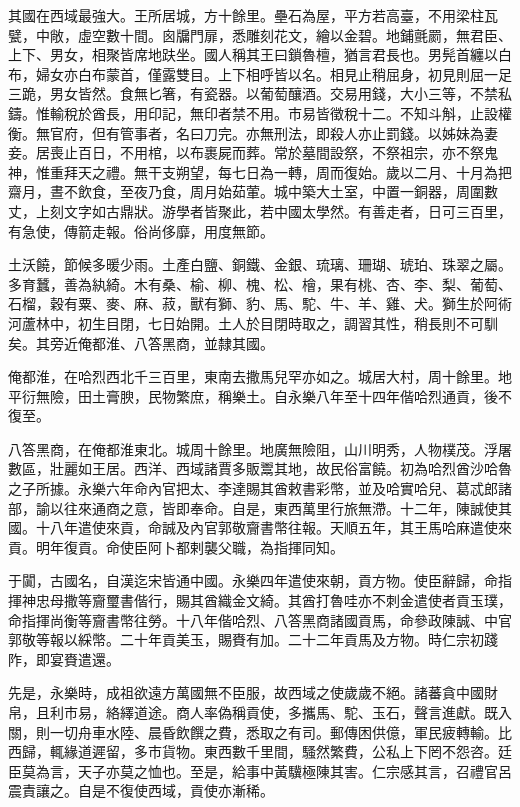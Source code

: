 \begin{pinyinscope}
其國在西域最強大。王所居城，方十餘里。壘石為屋，平方若高臺，不用梁柱瓦甓，中敞，虛空數十間。囪牖門扉，悉雕刻花文，繪以金碧。地鋪氈罽，無君臣、上下、男女，相聚皆席地趺坐。國人稱其王曰鎖魯檀，猶言君長也。男髡首纏以白布，婦女亦白布蒙首，僅露雙目。上下相呼皆以名。相見止稍屈身，初見則屈一足三跪，男女皆然。食無匕箸，有瓷器。以葡萄釀酒。交易用錢，大小三等，不禁私鑄。惟輸稅於酋長，用印記，無印者禁不用。市易皆徵稅十二。不知斗斛，止設權衡。無官府，但有管事者，名曰刀完。亦無刑法，即殺人亦止罰錢。以姊妹為妻妾。居喪止百日，不用棺，以布裹屍而葬。常於墓間設祭，不祭祖宗，亦不祭鬼神，惟重拜天之禮。無干支朔望，每七日為一轉，周而復始。歲以二月、十月為把齋月，晝不飲食，至夜乃食，周月始茹葷。城中築大土室，中置一銅器，周圍數丈，上刻文字如古鼎狀。游學者皆聚此，若中國太學然。有善走者，日可三百里，有急使，傳箭走報。俗尚侈靡，用度無節。

土沃饒，節候多暖少雨。土產白鹽、銅鐵、金銀、琉璃、珊瑚、琥珀、珠翠之屬。多育蠶，善為紈綺。木有桑、榆、柳、槐、松、檜，果有桃、杏、李、梨、葡萄、石榴，穀有粟、麥、麻、菽，獸有獅、豹、馬、駝、牛、羊、雞、犬。獅生於阿術河蘆林中，初生目閉，七日始開。土人於目閉時取之，調習其性，稍長則不可馴矣。其旁近俺都淮、八答黑商，並隸其國。

俺都淮，在哈烈西北千三百里，東南去撒馬兒罕亦如之。城居大村，周十餘里。地平衍無險，田土膏腴，民物繁庶，稱樂土。自永樂八年至十四年偕哈烈通貢，後不復至。

八答黑商，在俺都淮東北。城周十餘里。地廣無險阻，山川明秀，人物樸茂。浮屠數區，壯麗如王居。西洋、西域諸賈多販鬻其地，故民俗富饒。初為哈烈酋沙哈魯之子所據。永樂六年命內官把太、李達賜其酋敕書彩幣，並及哈實哈兒、葛忒郎諸部，諭以往來通商之意，皆即奉命。自是，東西萬里行旅無滯。十二年，陳誠使其國。十八年遣使來貢，命誠及內官郭敬齎書幣往報。天順五年，其王馬哈麻遣使來貢。明年復貢。命使臣阿卜都剌襲父職，為指揮同知。

于闐，古國名，自漢迄宋皆通中國。永樂四年遣使來朝，貢方物。使臣辭歸，命指揮神忠母撒等齎璽書偕行，賜其酋織金文綺。其酋打魯哇亦不刺金遣使者貢玉璞，命指揮尚衡等齎書幣往勞。十八年偕哈烈、八答黑商諸國貢馬，命參政陳誠、中官郭敬等報以綵幣。二十年貢美玉，賜賚有加。二十二年貢馬及方物。時仁宗初踐阼，即宴賚遣還。

先是，永樂時，成祖欲遠方萬國無不臣服，故西域之使歲歲不絕。諸蕃貪中國財帛，且利市易，絡繹道途。商人率偽稱貢使，多攜馬、駝、玉石，聲言進獻。既入關，則一切舟車水陸、晨昏飲饌之費，悉取之有司。郵傳困供億，軍民疲轉輸。比西歸，輒緣道遲留，多市貨物。東西數千里間，騷然繁費，公私上下罔不怨咨。廷臣莫為言，天子亦莫之恤也。至是，給事中黃驥極陳其害。仁宗感其言，召禮官呂震責讓之。自是不復使西域，貢使亦漸稀。


\end{pinyinscope}
